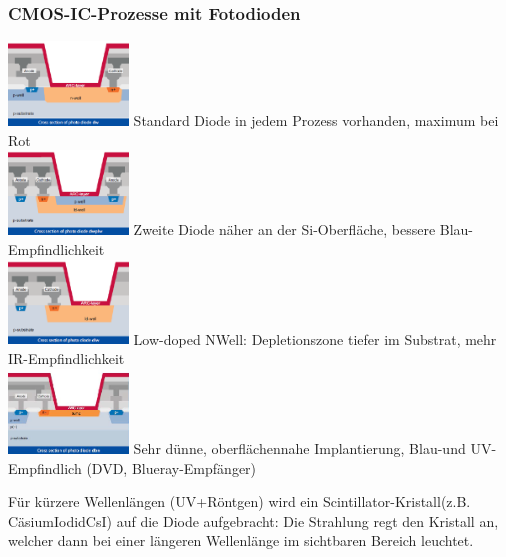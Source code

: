 \subsubsection{CMOS-IC-Prozesse mit Fotodioden}
\begin{multicols}{4}
    \includegraphics[width=0.24\textwidth]{images/eindringtiefe_01}
    Standard Diode in jedem Prozess vorhanden, maximum bei Rot \\
    \includegraphics[width=0.24\textwidth]{images/eindringtiefe_02}
    Zweite Diode näher an der Si-Oberfläche, bessere Blau-Empfindlichkeit \\
    \includegraphics[width=0.24\textwidth]{images/eindringtiefe_03}
    Low-doped NWell: Depletionszone tiefer im Substrat, mehr IR-Empfindlichkeit \\
    \includegraphics[width=0.24\textwidth]{images/eindringtiefe_04}
    Sehr dünne, oberflächennahe Implantierung, Blau-und UV-Empfindlich (DVD, Blueray-Empfänger)
\end{multicols}

Für kürzere Wellenlängen (UV+Röntgen) wird ein Scintillator-Kristall(z.B. CäsiumIodidCsI) auf die Diode aufgebracht: Die Strahlung regt den Kristall an, welcher dann bei einer längeren Wellenlänge im sichtbaren Bereich leuchtet.
